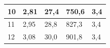 \documentclass[a4paper,12pt]{article} %
\begin{document}
\begin{table}[h!]
\begin{tabular}{|lllll|}
\multicolumn{1}{|l|}{10}  & \multicolumn{1}{l|}{2,81}               & \multicolumn{1}{l|}{27,4}               & \multicolumn{1}{l|}{750,6}                  & 3,4                             \\ \hline
\multicolumn{1}{|l|}{11}  & \multicolumn{1}{l|}{2,95}               & \multicolumn{1}{l|}{28,8}               & \multicolumn{1}{l|}{827,3}                  & 3,4                             \\ \hline
\multicolumn{1}{|l|}{12}  & \multicolumn{1}{l|}{3,08}               & \multicolumn{1}{l|}{30,0}               & \multicolumn{1}{l|}{901,8}                  & 3,4                             \\ \hline
\end{tabular}
\end{table}

\newpage
\end{document}
